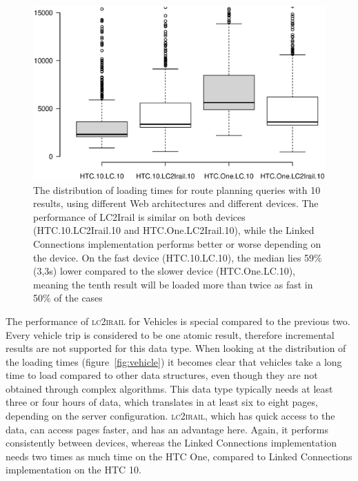 \documentclass[twocolumn]{phdsymp} %
\begin{document}
\begin{figure}[ht]
	\begin{center}
		\includegraphics[trim=3cm 4cm 0 0, width=.50\textwidth]{images/boxplot_routes_10.eps}
		\caption{\label{fig:routebox} The distribution of loading times for route planning queries with 10 results, using different Web architectures and different devices. The performance of LC2Irail is similar on both devices (HTC.10.LC2Irail.10 and HTC.One.LC2Irail.10), while the Linked Connections implementation performs better or worse depending on the device. On the fast device (HTC.10.LC.10), the median lies 59\% (3,3s) lower compared to the slower device (HTC.One.LC.10), meaning the tenth result will be loaded more than twice as fast in 50\% of the cases }
	\end{center}
\end{figure}

The performance of \textsc{lc2irail} for Vehicles is special compared to the previous two. Every vehicle trip is considered to be one atomic result, therefore incremental results are not supported for this data type. When looking at the distribution of the loading times (figure~\ref{fig:vehicle}) it becomes clear that vehicles take a long time to load compared to other data structures, even though they are not obtained through complex algorithms. This data type typically needs at least three or four hours of data, which translates in at least six to eight pages, depending on the server configuration. \textsc{lc2irail}, which has quick access to the data, can access pages faster, and has an advantage here. Again, it performs consistently between devices, whereas the Linked Connections implementation needs two times as much time on the HTC One, compared to Linked Connections implementation on the HTC 10.
\end{document}
